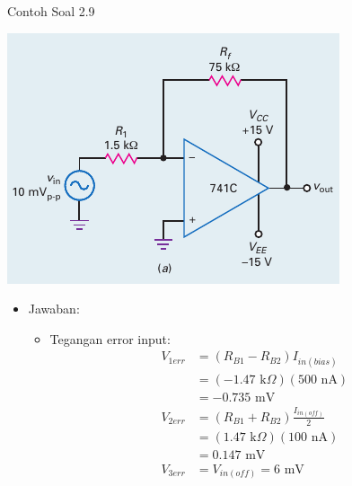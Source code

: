 \begin{frame}[t]{Contoh Soal 2.9}
	\begin{multicols}{2}
		\begin{center}
			\includegraphics[width=\linewidth]{gambar/fig-16.17a}
		\end{center}
		\columnbreak
		\begin{itemize}
			\item Jawaban:
			\begin{itemize}
				\item Tegangan error input:
				\begin{align*}
					V_{1err} &= (R_{B1} - R_{B2})I_{in(bias)} \\
					&= ( - 1.47 \text{ k}\Omega )(500 \text{ nA}) \\
					&= -0.735 \text{ mV} \\
					V_{2err} &= (R_{B1} + R_{B2}) \frac{I_{in(off)}}{2} \\
					&= ( 1.47 \text{ k}\Omega )(100 \text{ nA}) \\
					&= 0.147 \text{ mV} \\
					V_{3err} &= V_{in(off)} = 6 \text{ mV}
				\end{align*}
			\end{itemize}
		\end{itemize}
	\end{multicols}
\end{frame}


